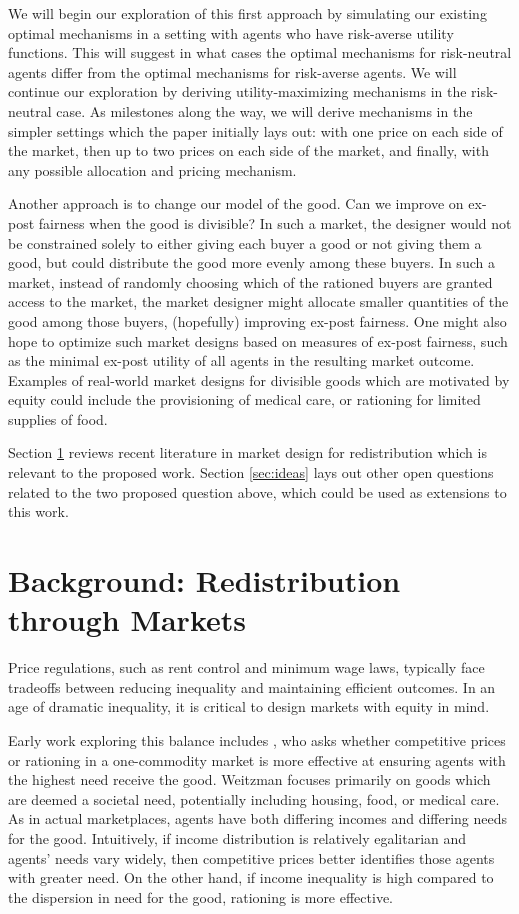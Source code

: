 \documentclass[AER]{AEA}
\begin{document}
We will begin our exploration of this first approach by simulating our existing optimal mechanisms in a setting with agents who have risk-averse utility functions. This will suggest in what cases the optimal mechanisms for risk-neutral agents differ from the optimal mechanisms for risk-averse agents. We will continue our exploration by deriving utility-maximizing mechanisms in the risk-neutral case. As milestones along the way, we will derive mechanisms in the simpler settings which the paper initially lays out: with one price on each side of the market, then up to two prices on each side of the market, and finally, with any possible allocation and pricing mechanism.

Another approach is to change our model of the good. Can we improve on ex-post fairness when the good is divisible? In such a market, the designer would not be constrained solely to either giving each buyer a good or not giving them a good, but could distribute the good more evenly among these buyers. In such a market, instead of randomly choosing which of the rationed buyers are granted access to the market, the market designer might allocate smaller quantities of the good among those buyers, (hopefully) improving ex-post fairness. One might also hope to optimize such market designs based on measures of ex-post fairness, such as the minimal ex-post utility of all agents in the resulting market outcome. Examples of real-world market designs for divisible goods which are motivated by equity could include the provisioning of medical care, or rationing for limited supplies of food.

Section \ref{sec:background-redist} reviews recent literature in market design for redistribution which is relevant to the proposed work. Section \ref{sec:ideas} lays out other open questions related to the two proposed question above, which could be used as extensions to this work.

\section{Background: Redistribution through Markets}
\label{sec:background-redist}

Price regulations, such as rent control and minimum wage laws, typically face tradeoffs between reducing inequality and maintaining efficient outcomes. In an age of dramatic inequality, it is critical to design markets with equity in mind.

Early work exploring this balance includes \cite{weitzman-1977}, who asks whether competitive prices or rationing in a one-commodity market is more effective at ensuring agents with the highest need receive the good. Weitzman focuses primarily on goods which are deemed a societal need, potentially including housing, food, or medical care. As in actual marketplaces, agents have both differing incomes and differing needs for the good. Intuitively, if income distribution is relatively egalitarian and agents' needs vary widely, then competitive prices better identifies those agents with greater need. On the other hand, if income inequality is high compared to the dispersion in need for the good, rationing is more effective.
\end{document}
